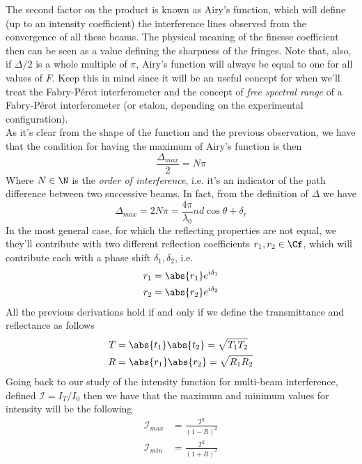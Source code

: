 \documentclass[../electromagnetism.tex]{subfiles}
\begin{document}
The second factor on the product is known as Airy's function, which will define (up to an intensity coefficient) the interference lines observed from the convergence of all these beams. The physical meaning of the finesse coefficient then can be seen as a value defining the sharpness of the fringes. Note that, also, if $\Delta/2$ is a whole multiple of $\pi$, Airy's function will always be equal to one for all values of $F$. Keep this in mind since it will be an useful concept for when we'll treat the Fabry-Pérot interferometer and the concept of \emph{free spectral range} of a Fabry-Pérot interferometer (or etalon, depending on the experimental configuration).\\
As it's clear from the shape of the function and the previous observation, we have that the condition for having the maximum of Airy's function is then
\begin{equation*}
	\frac{\Delta_{max}}{2}=N\pi
\end{equation*}
Where $N\in\N$ is the \emph{order of interference}, i.e. it's an indicator of the path difference between two successive beams. In fact, from the definition of $\Delta$ we have
\begin{equation}
	\Delta_{max}=2N\pi=\frac{4\pi}{\lambda_0}nd\cos\theta+\delta_r
	\label{eq:maxdeltafabryperot}
\end{equation}
In the most general case, for which the reflecting properties are not equal, we they'll contribute with two different reflection coefficients $r_1,r_2\in\Cf$, which will contribute each with a phase shift $\delta_1,\delta_2$, i.e.
\begin{equation}
	\begin{aligned}
		r_1&= \abs{r_1}e^{i\delta_1}\\
		r_2&= \abs{r_2}e^{i\delta_2}
	\end{aligned}
\end{equation}
All the previous derivations hold if and only if we define the transmittance and reflectance as follows
\begin{equation}
	\begin{aligned}
		T&= \abs{t_1}\abs{t_2}=\sqrt{T_1T_2}\\
		R&= \abs{r_1}\abs{r_2}=\sqrt{R_1R_2}
	\end{aligned}
\end{equation}
Going back to our study of the intensity function for multi-beam interference, defined $\mathcal{I}=I_T/I_0$ then we have that the maximum and minimum values for intensity will be the following
\begin{equation}
	\begin{aligned}
		\mathcal{I}_{max}&= \frac{T^2}{(1-R)^2}\\
		\mathcal{I}_{min}&= \frac{T^2}{(1+R)^2}
	\end{aligned}
	\label{eq:maxminweighpow}
\end{equation}
\end{document}
